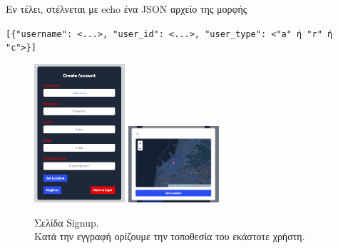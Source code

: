         Εν τέλει, στέλνεται με echo ένα JSON αρχείο της μορφής
        \begin{graycomment}
            \verb|[{"username": <...>, "user_id": <...>, "user_type": <"a" ή "r" ή "c">}]|
        \end{graycomment}

    \begin{figure}[h!] \noindent \centering
        \includegraphics[width=0.3\textwidth]{img/register}
        \includegraphics[width=0.3\textwidth]{img/register-location}
        \caption{Σελίδα Signup. \\Κατά την εγγραφή ορίζουμε την τοποθεσία του εκάστοτε χρήστη.}
    \end{figure}
